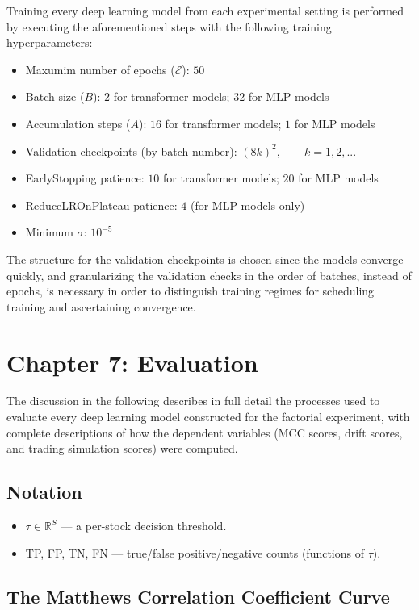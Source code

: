 \documentclass[stu,floatsintext]{apa7}
\newcommand{\R}{\mathbb{R}}
\begin{document}
Training every deep learning model from each experimental setting is performed by executing the aforementioned steps with the following training hyperparameters:
\begin{itemize}
  \item Maxumim number of epochs ($\mathcal E$): $50$
  \item Batch size ($B$): $2$ for transformer models; $32$ for MLP models
  \item Accumulation steps ($A$): $16$ for transformer models; $1$ for MLP models
  \item Validation checkpoints (by batch number): $(8k)^2,\qquad k=1,2,...$
  \item EarlyStopping patience: $10$ for transformer models; $20$ for MLP models
  \item ReduceLROnPlateau patience: $4$ (for MLP models only)
  \item Minimum $\sigma$: $10^{-5}$
\end{itemize}
The structure for the validation checkpoints is chosen since the models converge quickly, and granularizing the validation checks in the order of batches, instead of epochs, is necessary in order to distinguish training regimes for scheduling training and ascertaining convergence.

\clearpage
\section{Chapter 7: Evaluation}

The discussion in the following describes in full detail the processes used to evaluate every deep learning model constructed for the factorial experiment, with complete descriptions of how the dependent variables (MCC scores, drift scores, and trading simulation scores) were computed.

\subsection{Notation}

\begin{itemize}
  \item $\tau\in\R^S$ — a per-stock decision threshold.
  \item TP, FP, TN, FN — true/false positive/negative counts (functions of $\tau$).
\end{itemize}

\subsection{The Matthews Correlation Coefficient Curve}
\end{document}
